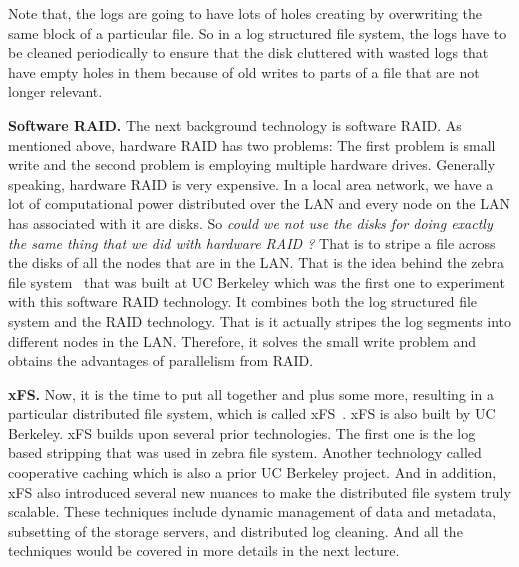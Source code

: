 \documentclass[11pt]{lecture}
\begin{document}
Note that, the logs are going to have lots of holes creating by overwriting the same block of 
a particular file. So in a log structured file system, the logs have to be cleaned periodically 
to ensure that the disk cluttered with wasted logs that have empty holes in them because of old 
writes to parts of a file that are not longer relevant. 


\noindent
{\bf Software RAID.} The next background technology is software RAID. As mentioned above, hardware 
RAID has two problems: The first problem is small write and the second problem is employing 
multiple hardware drives. Generally speaking, hardware RAID is very expensive. In a local 
area network, we have a lot of computational power distributed over the LAN and every node on the LAN 
has associated with it are disks. So {\it could we not use the disks for doing exactly the same thing that 
we did with hardware RAID ?} That is to stripe a file across the disks of all the nodes that are in the LAN. 
That is the idea behind the zebra file system~\cite{Hartman1994Zebra} that was built at UC Berkeley which was the first one 
to experiment with this software RAID technology. It combines both the log structured file system 
and the RAID technology. That is it actually stripes the log segments into different nodes in the LAN. 
Therefore, it solves the small write problem and obtains the advantages of parallelism from RAID. 

\noindent
{\bf xFS.} Now, it is the time to put all together and plus some more, resulting in a particular 
distributed file system, which is called xFS~\cite{AndersonXFS}. xFS is also built by UC Berkeley. xFS builds upon 
several prior technologies. The first one is the log based stripping that was used in zebra file system. 
Another technology called cooperative caching which is also a prior UC Berkeley project. And in addition, 
xFS also introduced several new nuances to make the distributed file system truly scalable. These 
techniques include dynamic management of data and metadata, subsetting of the storage servers, and 
distributed log cleaning. And all the techniques would be covered in more details in the next lecture. 







\end{document}
